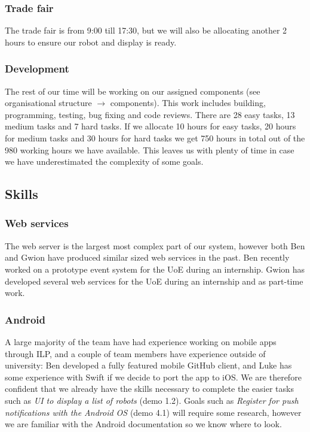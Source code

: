 \documentclass[onecolumn]{IEEEtran}
\begin{document}
\subsubsection{Trade fair}

The trade fair is from 9:00 till 17:30, but we will also be allocating another 2 hours to ensure our robot and display is ready.

\subsubsection{Development}

The rest of our time will be working on our assigned components (see organisational structure $\rightarrow$ components). This work includes building, programming, testing, bug fixing and code reviews. There are 28 easy tasks, 13 medium tasks and 7 hard tasks. If we allocate 10 hours for easy tasks, 20 hours for medium tasks and 30 hours for hard tasks we get 750 hours in total out of the 980 working hours we have available. This leaves us with plenty of time in case we have underestimated the complexity of some goals.

\subsection{Skills}

\subsubsection{Web services}

The web server is the largest most complex part of our system, however both Ben and Gwion have produced similar sized web services in the past. Ben recently worked on a prototype event system for the UoE during an internship. Gwion has developed several web services for the UoE during an internship and as part-time work.

\subsubsection{Android}

A large majority of the team have had experience working on mobile apps through ILP, and a couple of team members have experience outside of university: Ben developed a fully featured mobile GitHub client, and Luke has some experience with Swift if we decide to port the app to iOS. We are therefore confident that we already have the skills necessary to complete the easier tasks such as \textit{UI to display a list of robots} (demo 1.2). Goals such as \textit{Register for push notifications with the Android OS} (demo 4.1) will require some research, however we are familiar with the Android documentation so we know where to look.
\end{document}
